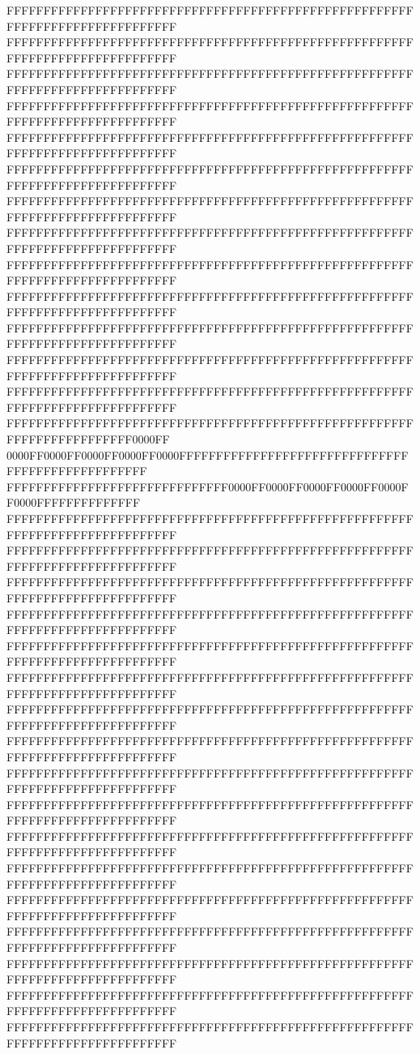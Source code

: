 FFFFFFFFFFFFFFFFFFFFFFFFFFFFFFFFFFFFFFFFFFFFFFFFFFFFFFFFFFFFFFFFFFFFFFFFFFFFFF
FFFFFFFFFFFFFFFFFFFFFFFFFFFFFFFFFFFFFFFFFFFFFFFFFFFFFFFFFFFFFFFFFFFFFFFFFFFFFF
FFFFFFFFFFFFFFFFFFFFFFFFFFFFFFFFFFFFFFFFFFFFFFFFFFFFFFFFFFFFFFFFFFFFFFFFFFFFFF
FFFFFFFFFFFFFFFFFFFFFFFFFFFFFFFFFFFFFFFFFFFFFFFFFFFFFFFFFFFFFFFFFFFFFFFFFFFFFF
FFFFFFFFFFFFFFFFFFFFFFFFFFFFFFFFFFFFFFFFFFFFFFFFFFFFFFFFFFFFFFFFFFFFFFFFFFFFFF
FFFFFFFFFFFFFFFFFFFFFFFFFFFFFFFFFFFFFFFFFFFFFFFFFFFFFFFFFFFFFFFFFFFFFFFFFFFFFF
FFFFFFFFFFFFFFFFFFFFFFFFFFFFFFFFFFFFFFFFFFFFFFFFFFFFFFFFFFFFFFFFFFFFFFFFFFFFFF
FFFFFFFFFFFFFFFFFFFFFFFFFFFFFFFFFFFFFFFFFFFFFFFFFFFFFFFFFFFFFFFFFFFFFFFFFFFFFF
FFFFFFFFFFFFFFFFFFFFFFFFFFFFFFFFFFFFFFFFFFFFFFFFFFFFFFFFFFFFFFFFFFFFFFFFFFFFFF
FFFFFFFFFFFFFFFFFFFFFFFFFFFFFFFFFFFFFFFFFFFFFFFFFFFFFFFFFFFFFFFFFFFFFFFFFFFFFF
FFFFFFFFFFFFFFFFFFFFFFFFFFFFFFFFFFFFFFFFFFFFFFFFFFFFFFFFFFFFFFFFFFFFFFFFFFFFFF
FFFFFFFFFFFFFFFFFFFFFFFFFFFFFFFFFFFFFFFFFFFFFFFFFFFFFFFFFFFFFFFFFFFFFFFFFFFFFF
FFFFFFFFFFFFFFFFFFFFFFFFFFFFFFFFFFFFFFFFFFFFFFFFFFFFFFFFFFFFFFFFFFFFFFFFFFFFFF
FFFFFFFFFFFFFFFFFFFFFFFFFFFFFFFFFFFFFFFFFFFFFFFFFFFFFFFFFFFFFFFFFFFFFFFF0000FF
0000FF0000FF0000FF0000FF0000FFFFFFFFFFFFFFFFFFFFFFFFFFFFFFFFFFFFFFFFFFFFFFFFFF
FFFFFFFFFFFFFFFFFFFFFFFFFFFFFF0000FF0000FF0000FF0000FF0000FF0000FFFFFFFFFFFFFF
FFFFFFFFFFFFFFFFFFFFFFFFFFFFFFFFFFFFFFFFFFFFFFFFFFFFFFFFFFFFFFFFFFFFFFFFFFFFFF
FFFFFFFFFFFFFFFFFFFFFFFFFFFFFFFFFFFFFFFFFFFFFFFFFFFFFFFFFFFFFFFFFFFFFFFFFFFFFF
FFFFFFFFFFFFFFFFFFFFFFFFFFFFFFFFFFFFFFFFFFFFFFFFFFFFFFFFFFFFFFFFFFFFFFFFFFFFFF
FFFFFFFFFFFFFFFFFFFFFFFFFFFFFFFFFFFFFFFFFFFFFFFFFFFFFFFFFFFFFFFFFFFFFFFFFFFFFF
FFFFFFFFFFFFFFFFFFFFFFFFFFFFFFFFFFFFFFFFFFFFFFFFFFFFFFFFFFFFFFFFFFFFFFFFFFFFFF
FFFFFFFFFFFFFFFFFFFFFFFFFFFFFFFFFFFFFFFFFFFFFFFFFFFFFFFFFFFFFFFFFFFFFFFFFFFFFF
FFFFFFFFFFFFFFFFFFFFFFFFFFFFFFFFFFFFFFFFFFFFFFFFFFFFFFFFFFFFFFFFFFFFFFFFFFFFFF
FFFFFFFFFFFFFFFFFFFFFFFFFFFFFFFFFFFFFFFFFFFFFFFFFFFFFFFFFFFFFFFFFFFFFFFFFFFFFF
FFFFFFFFFFFFFFFFFFFFFFFFFFFFFFFFFFFFFFFFFFFFFFFFFFFFFFFFFFFFFFFFFFFFFFFFFFFFFF
FFFFFFFFFFFFFFFFFFFFFFFFFFFFFFFFFFFFFFFFFFFFFFFFFFFFFFFFFFFFFFFFFFFFFFFFFFFFFF
FFFFFFFFFFFFFFFFFFFFFFFFFFFFFFFFFFFFFFFFFFFFFFFFFFFFFFFFFFFFFFFFFFFFFFFFFFFFFF
FFFFFFFFFFFFFFFFFFFFFFFFFFFFFFFFFFFFFFFFFFFFFFFFFFFFFFFFFFFFFFFFFFFFFFFFFFFFFF
FFFFFFFFFFFFFFFFFFFFFFFFFFFFFFFFFFFFFFFFFFFFFFFFFFFFFFFFFFFFFFFFFFFFFFFFFFFFFF
FFFFFFFFFFFFFFFFFFFFFFFFFFFFFFFFFFFFFFFFFFFFFFFFFFFFFFFFFFFFFFFFFFFFFFFFFFFFFF
FFFFFFFFFFFFFFFFFFFFFFFFFFFFFFFFFFFFFFFFFFFFFFFFFFFFFFFFFFFFFFFFFFFFFFFFFFFFFF
FFFFFFFFFFFFFFFFFFFFFFFFFFFFFFFFFFFFFFFFFFFFFFFFFFFFFFFFFFFFFFFFFFFFFFFFFFFFFF
FFFFFFFFFFFFFFFFFFFFFFFFFFFFFFFFFFFFFFFFFFFFFFFFFFFFFFFFFFFFFFFFFFFFFFFFFFFFFF
